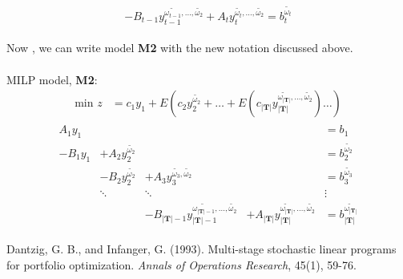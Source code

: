 \documentclass[12pt,a4paper]{article}
\begin{document}
\[-B_{t-1} y_{t-1}^{\tilde{\omega_{t-1}},\ldots ,\tilde{\omega_2}} + A_{t} y_{t}^{\tilde{\omega_{t}},\ldots ,\tilde{\omega_2}}	= b_{t}^{\tilde{\omega_{t}}} \] \\
Now , we can write model \textbf{M2} with the new notation discussed above.\\ \\
MILP model, \textbf{M2}: \\
\begin{align*}
\text{min }z & = c_1 y_1 +E (c_2 y_2^{\tilde{\omega_2}} +\ldots + E (c_{|\textbf{T}|} y_{|\textbf{T}|}^{\tilde{\omega_{|\textbf{T}|}},\ldots ,\tilde{\omega_2}}) \ldots )
\end{align*}
\begin{align}
\begin{matrix}
A_1 y_1		& 									&													&	& = b_1\\
-B_{1} y_1	& + A_2 y_2^{\tilde{\omega_2}}		& 													& 	& = b_2^{\tilde{\omega_2}}\\
			& - B_{2} y_2^{\tilde{\omega_2}}	&+A_3 y_3^{\tilde{\omega_3},\tilde{\omega_2}}		& 	& = b_3^{\tilde{\omega_3}}\\
			& \ddots							& \ddots											&	& \vdots \\
			&									&-B_{|\textbf{T}|-1} y_{|\textbf{T}|-1}^{\tilde{\omega_{|\textbf{T}|-1}},\ldots ,\tilde{\omega_2}}	&+A_{|\textbf{T}|} y_{|\textbf{T}|}^{\tilde{\omega_{|\textbf{T}|}},\ldots ,\tilde{\omega_2}}	& = b_{|\textbf{T}|}^{\tilde{\omega_{|\textbf{T}|}}}
\end{matrix}
\end{align}
 
\pagebreak

\begin{thebibliography}{10}

Dantzig, G. B., and Infanger, G. (1993). Multi-stage stochastic linear programs for portfolio optimization. \emph{Annals of Operations Research}, 45(1), 59-76.

\end{thebibliography}
\end{document}

